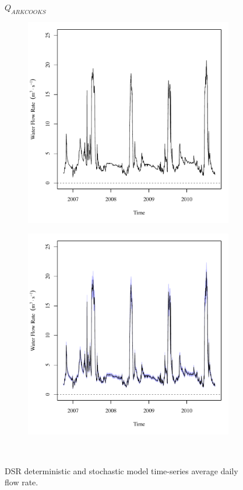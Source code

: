 \begin{landscape}
	\begin{figure}
		\centering
		$ Q_{ARKCOOKS} $
		\begin{subfigure}{0.7\textwidth}
			\centering
			\includegraphics[width=\tableCustomSize]{"Figures/Results_DSR/Deterministic/Q out"}
		\end{subfigure}%
		\begin{subfigure}{0.7\textwidth}
			\centering
			\includegraphics[width=\tableCustomSize]{"Figures/Results_DSR/Stochastic/Q out"}
		\end{subfigure}\\
		\caption{DSR deterministic and stochastic model time-series average daily flow rate.}
	\end{figure}
\end{landscape}
